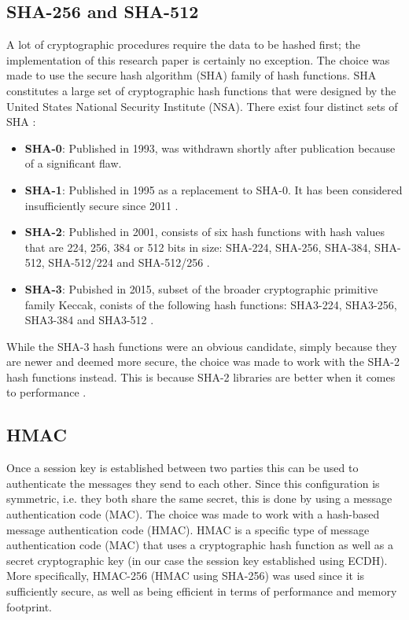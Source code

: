 \subsection{SHA-256 and SHA-512} 
\label{subsec:sha}

A lot of cryptographic procedures require the data to be hashed first; the implementation of this research paper is certainly no exception. The choice was made to use the secure hash algorithm (SHA) family of hash functions. SHA constitutes a large set of cryptographic hash functions that were designed by the United States National Security Institute (NSA). There exist four distinct sets of SHA \cite{wiki:SHA}:

\begin{itemize}
	\item \textbf{SHA-0}: Published in 1993, was withdrawn shortly after publication because of a significant flaw.
	
	\item \textbf{SHA-1}: Published in 1995 as a replacement to SHA-0. It has been considered insufficiently secure since 2011 \cite{Stevens}.
	
	\item \textbf{SHA-2}: Published in 2001, consists of six hash functions with hash values that are 224, 256, 384 or 512 bits in size: SHA-224, SHA-256, SHA-384, SHA-512, SHA-512/224 and SHA-512/256 \cite{RFC6234}.
	
	\item \textbf{SHA-3}: Pubished in 2015, subset of the broader cryptographic primitive family Keccak, conists of the following hash functions: SHA3-224, SHA3-256, SHA3-384 and SHA3-512 \cite{SHA3}.
\end{itemize} 
While the SHA-3 hash functions were an obvious candidate, simply because they are newer and deemed more secure, the choice was made to work with the SHA-2 hash functions instead. This is because SHA-2 libraries are better when it comes to performance \cite{Murvay}.

\subsection{HMAC} 
\label{subsec:hmac}

Once a session key is established between two parties this can be used to authenticate the messages they send to each other. Since this configuration is symmetric, i.e. they both share the same secret, this is done by using a message authentication code (MAC). The choice was made to work with a hash-based message authentication code (HMAC). HMAC is a specific type of message authentication code (MAC) that uses a cryptographic hash function as well as a secret cryptographic key (in our case the session key established using ECDH). More specifically, HMAC-256 (HMAC using SHA-256) was used since it is sufficiently secure, as well as being efficient in terms of performance and memory footprint.

